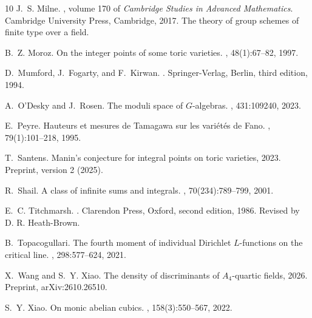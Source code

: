 \begin{thebibliography}{10}
J.~S. Milne.
, volume 170 of {\em Cambridge Studies in
  Advanced Mathematics}.
\newblock Cambridge University Press, Cambridge, 2017.
\newblock The theory of group schemes of finite type over a field.

B.~Z. Moroz.
\newblock On the integer points of some toric varieties.
, 48(1):67--82, 1997.

D.~Mumford, J.~Fogarty, and F.~Kirwan.
.
\newblock Springer-Verlag, Berlin, third edition, 1994.

A.~O'Desky and J.~Rosen.
\newblock The moduli space of ${G}$-algebras.
, 431:109240, 2023.

E.~Peyre.
\newblock Hauteurs et mesures de {Tamagawa} sur les vari{\'e}t{\'e}s de {Fano}.
, 79(1):101--218, 1995.

T.~Santens.
\newblock Manin's conjecture for integral points on toric varieties, 2023.
\newblock Preprint, version 2 (2025).

R.~Shail.
\newblock A class of infinite sums and integrals.
, 70(234):789--799, 2001.

E.~C. Titchmarsh.
.
\newblock Clarendon Press, Oxford, second edition, 1986.
\newblock Revised by D. R. Heath-Brown.

B.~Topacogullari.
\newblock The fourth moment of individual {Dirichlet} {$L$}-functions on the
  critical line.
, 298:577--624, 2021.

X.~Wang and S.~Y. Xiao.
\newblock The density of discriminants of {$A_4$}-quartic fields, 2026.
\newblock Preprint, arXiv:2610.26510.

S.~Y. Xiao.
\newblock On monic abelian cubics.
, 158(3):550–567, 2022.

\end{thebibliography}
